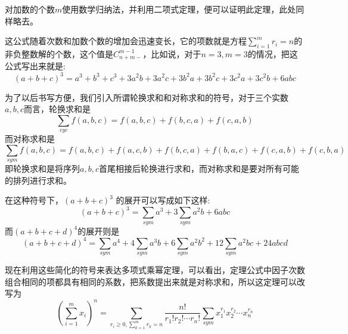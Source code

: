 对加数的个数$m$使用数学归纳法，并利用二项式定理，便可以证明此定理，此处同样略去。

这公式随着次数和加数个数的增加会迅速变长，它的项数就是方程$\sum_{i=1}^mr_i=n$的非负整数解的个数，这个值是$C_{n+m-}^{m-1}$，比如说，对于$n=3,m=3$的情况，把这公式写出来就是:
\begin{equation*}
  (a+b+c)^3 = a^3+b^3+c^3+3a^2b+3a^2c+3b^2a+3b^2c+3c^2a+3c^2b+6abc
\end{equation*}

为了以后书写方便，我们引入所谓轮换求和和对称求和的符号，对于三个实数$a,b,c$而言，轮换求和是
\begin{equation*}
  \sum_{cyc} f(a,b,c) = f(a,b,c) + f(b, c, a) + f(c, a ,b)
\end{equation*}
而对称求和是
\begin{equation*}
  \sum_{sym} f(a,b,c) = f(a, b, c) + f(a, c, b) + f(b, c, a) + f(b, a, c) + f(c, a, b) + f(c, b, a)
\end{equation*}
即轮换求和是将序列$a,b,c$首尾相接后轮换进行求和，而对称求和是要对所有可能的排列进行求和。

在这种符号下，$(a+b+c)^3$ 的展开可以写成如下这样:
\begin{equation*}
  (a+b+c)^3 = \sum_{sym}a^3+3\sum_{sym}a^2b+6abc
\end{equation*}
而$(a+b+c+d)^4$的展开则是
\begin{equation*}
  (a+b+c+d)^4 = \sum_{sym} a^4 + 4 \sum_{sym}a^3b + 6\sum_{sym}a^2b^2+12\sum_{sym}a^2bc+24abcd
\end{equation*}

现在利用这些简化的符号来表达多项式乘幂定理，可以看出，定理公式中因子次数组合相同的项都具有相同的系数，把系数提出来就是对称求和，所以这定理可以改写为
\begin{equation*}
  \left( \sum_{i=1}^m x_i \right)^n = \sum_{r_i \geqslant 0, \sum_{k=1}^m r_k=n} \frac{n!}{r_1!r_2!\cdots r_n!} \sum_{sym} x_1^{r_1}x_2^{r_2}\cdots x_n^{r_n}
\end{equation*}

